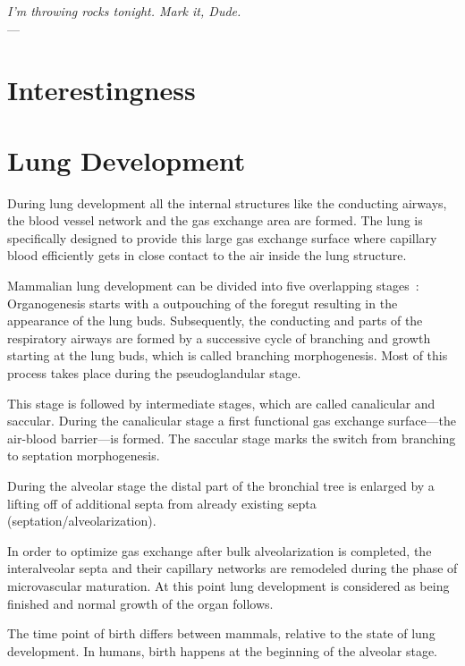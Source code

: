 \label{ch:lung}
\begin{flushright}{\slshape I'm throwing rocks tonight. Mark it, Dude.} \\ \medskip
    ---  \citep{TheBigLebowski}
\end{flushright}
\bigskip
\section{Interestingness}

\section{Lung Development}
During lung development all the internal structures like the conducting airways, the blood vessel network and the gas exchange area are formed. The lung is specifically designed to provide this large gas exchange surface where capillary blood efficiently gets in close contact to the air inside the lung structure. 

Mammalian lung development can be divided into five overlapping stages~\cite{Schittny2004}: Organogenesis starts with a outpouching of the foregut resulting in the appearance of the lung buds. Subsequently, the conducting and parts of the respiratory airways are formed by a successive cycle of branching and growth starting at the lung buds, which is called branching morphogenesis. Most of this process takes place during the pseudoglandular stage.

This stage is followed by intermediate stages, which are called canalicular and saccular. During the canalicular stage a first functional gas exchange surface---the air-blood barrier---is formed. The saccular stage marks the switch from branching to septation morphogenesis.

During the alveolar stage the distal part of the bronchial tree is enlarged by a lifting off of additional septa from already existing septa (septation/alveolarization). 

In order to optimize gas exchange after bulk alveolarization is completed, the interalveolar septa and their capillary networks are remodeled during the phase of microvascular maturation. At this point lung development is considered as being finished and normal growth of the organ follows.

The time point of birth differs between mammals, relative to the state of lung development. In humans, birth happens at the beginning of the alveolar stage.